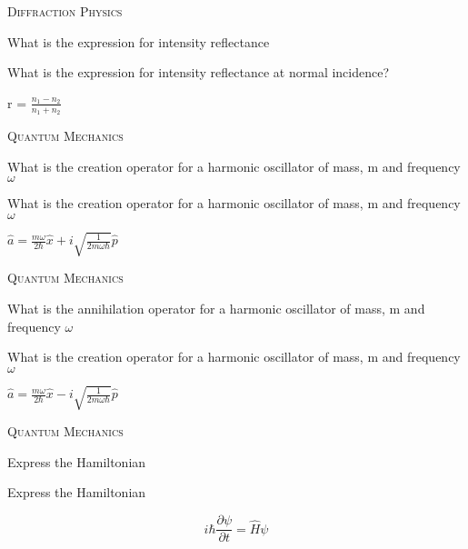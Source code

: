 \documentclass{article}
\newenvironment{flashcard}[2][]
  {\noindent\textsc{\Large#1}\par\vfill
   {\centering\Large#2\par}
   \vfill
   \newpage\Large\centering
  }
  {\newpage}
\begin{document}

\begin{flashcard}[Diffraction Physics]{What is the expression for intensity reflectance}
What is the expression for intensity reflectance at normal incidence?


r = $\frac{n_1-n_2}{n_1+n_2}$

\end{flashcard}



\begin{flashcard}[Quantum Mechanics]{What is the creation operator for a harmonic oscillator of mass, m and frequency $\omega$}
What is the creation operator for a harmonic oscillator of mass, m and frequency $\omega$

$\hat{a}=\frac{m\omega}{2\hbar}\hat{x}+i\sqrt{\frac{1}{2m\omega\hbar}}\hat{p}$


\end{flashcard}



\begin{flashcard}[Quantum Mechanics]{What is the annihilation operator for a harmonic oscillator of mass, m and frequency $\omega$}
What is the creation operator for a harmonic oscillator of mass, m and frequency $\omega$

$\hat{a}=\frac{m\omega}{2\hbar}\hat{x}-i\sqrt{\frac{1}{2m\omega\hbar}}\hat{p}$


\end{flashcard}




\begin{flashcard}[Quantum Mechanics]{Express the Hamiltonian}
Express the Hamiltonian

$$i\hbar\frac{\partial{\psi}}{\partial t}=\hat{H}\psi$$

\end{flashcard}
\end{document}
